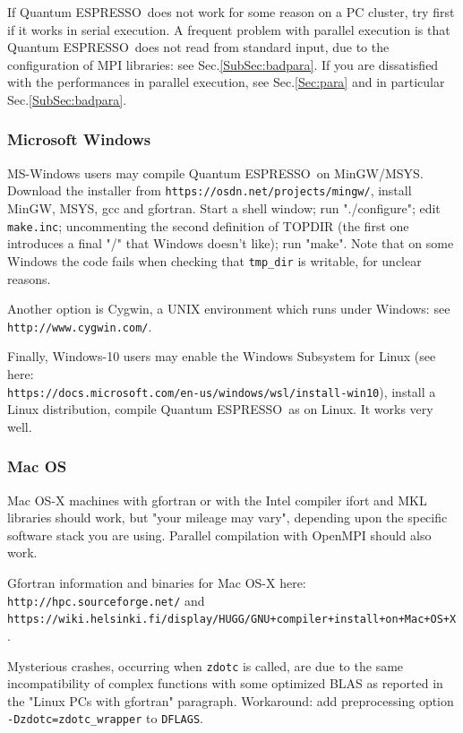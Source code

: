 \documentclass[12pt,a4paper]{article}
\def\qe{{\sc Quantum ESPRESSO}}
\begin{document}
If \qe\ does not work for some reason on a PC cluster,
try first if it works in serial execution. A frequent problem with parallel
execution is that \qe\ does not read from standard input,
due to the configuration of MPI libraries: see Sec.\ref{SubSec:badpara}.
If you are dissatisfied with the performances in parallel execution,
see Sec.\ref{Sec:para} and in particular Sec.\ref{SubSec:badpara}.

\subsubsection{Microsoft Windows}
\label{SubSec:Windows}
MS-Windows users may compile \qe\ on MinGW/MSYS. Download the installer from
\texttt{https://osdn.net/projects/mingw/}, install MinGW, MSYS, gcc and
gfortran. Start a shell window; run "./configure"; edit \texttt{make.inc}; 
uncommenting the second definition of TOPDIR (the first one introduces a 
final "/" that Windows doesn't like); run "make". Note that on some Windows 
the code fails when checking that \texttt{tmp\_dir} is writable, for unclear 
reasons.

Another option is Cygwin, a UNIX environment which runs under Windows: see\\
\texttt{http://www.cygwin.com/}. 

Finally, Windows-10 users may enable the Windows Subsystem for Linux
(see here:\\
\texttt{https://docs.microsoft.com/en-us/windows/wsl/install-win10}),
install a Linux distribution, compile \qe\ as on Linux. It works very well.

\subsubsection{Mac OS}

Mac OS-X machines with gfortran or with the Intel compiler ifort
and MKL libraries should work, but "your mileage may vary", depending
upon the specific software stack you are using. Parallel compilation 
with OpenMPI should also work. 

Gfortran information and binaries for Mac OS-X here:
\texttt{http://hpc.sourceforge.net/} and
\texttt{https://wiki.helsinki.fi/display/HUGG/GNU+compiler+install+on+Mac+OS+X}.

Mysterious crashes, occurring when \texttt{zdotc} is called, are due
to the same incompatibility of complex functions with some optimized
BLAS as reported in the "Linux PCs with gfortran" paragraph. Workaround:
add preprocessing option \texttt{-Dzdotc=zdotc\_wrapper} to \texttt{DFLAGS}.
\end{document}
